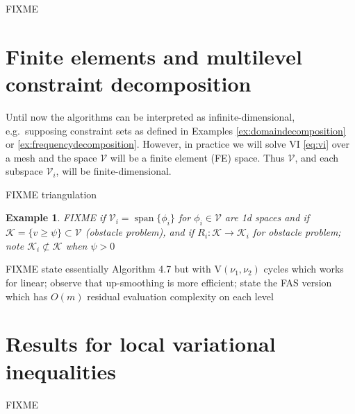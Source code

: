 \documentclass[letterpaper,final,12pt,reqno]{amsart}
\theoremstyle{cstyle}
\theoremstyle{cstyle*}
\theoremstyle{dstyle}
\newtheorem{example}[theorem]{Example}
\numberwithin{equation}{section}
\numberwithin{figure}{section}
\numberwithin{table}{section}
\numberwithin{theorem}{section}
\newcommand{\cK}{\mathcal{K}}
\newcommand{\cV}{\mathcal{V}}
\newcommand{\Span}{\operatorname{span}}
\begin{document}
FIXME

\section{Finite elements and multilevel constraint decomposition} \label{sec:multilevel}

Until now the algorithms can be interpreted as infinite-dimensional, e.g.~supposing constraint sets as defined in Examples \ref{ex:domaindecomposition} or \ref{ex:frequencydecomposition}.  However, in practice we will solve VI \eqref{eq:vi} over a mesh and the space $\cV$ will be a finite element (FE) space.  Thus $\cV$, and each subspace $\cV_i$, will be finite-dimensional.

FIXME triangulation

\begin{example}  FIXME if $\cV_i=\Span\{\phi_i\}$ for $\phi_i\in\cV$ are 1d spaces and if $\cK = \{v \ge \psi\} \subset \cV$ (obstacle problem), and if $R_i : \cK \to \cK_i$ for obstacle problem; note $\cK_i \not\subset \cK$ when $\psi>0$
\end{example}

FIXME state essentially Algorithm 4.7 \cite{GraeserKornhuber2009} but with $\text{V}(\nu_1,\nu_2)$ cycles which works for linear; observe that up-smoothing is more efficient; state the FAS version which has $O(m)$ residual evaluation complexity on each level


\section{Results for local variational inequalities} \label{sec:results}

FIXME





\small


\end{document}
